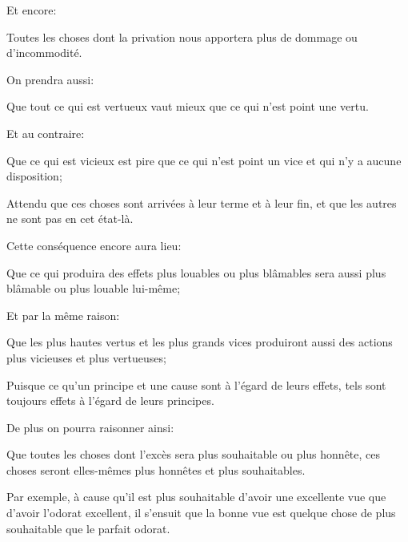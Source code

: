 \bigbreak

Et encore:

\begin{lieu}
	Toutes les choses dont la privation nous apportera plus de dommage ou d'incommodité.
\end{lieu}

\bigbreak

On prendra aussi:

\begin{lieu}
	Que tout ce qui est vertueux vaut mieux que ce qui n'est point une vertu.
\end{lieu}

Et au contraire:

\begin{lieu}
	Que ce qui est vicieux est pire que ce qui n'est point un vice et qui n'y a aucune disposition;
\end{lieu}

Attendu que ces choses sont arrivées à leur terme et à leur fin, et que les autres ne sont pas en cet état-là.

\bigbreak

Cette conséquence encore aura lieu:

\begin{lieu}
	Que ce qui produira des effets plus louables ou plus blâmables sera aussi plus blâmable ou plus louable
	lui-même;
\end{lieu}

Et par la même raison:

\begin{lieu}
	Que les plus hautes vertus et les plus grands vices produiront aussi des actions plus vicieuses et plus
	vertueuses;
\end{lieu}

Puisque ce qu'un principe et une cause sont à l’égard de leurs effets, tels sont toujours effets à l'égard de
leurs principes.

\bigbreak

De plus on pourra raisonner ainsi:

\begin{lieu}
	Que toutes les choses dont l'excès sera plus souhaitable ou plus honnête, ces choses seront elles-mêmes
	plus honnêtes et plus souhaitables.
\end{lieu}

Par exemple, à cause qu'il est plus souhaitable d'avoir une excellente vue que d'avoir l'odorat excellent, il
s'ensuit que la bonne vue est quelque chose de plus souhaitable que le parfait odorat.

